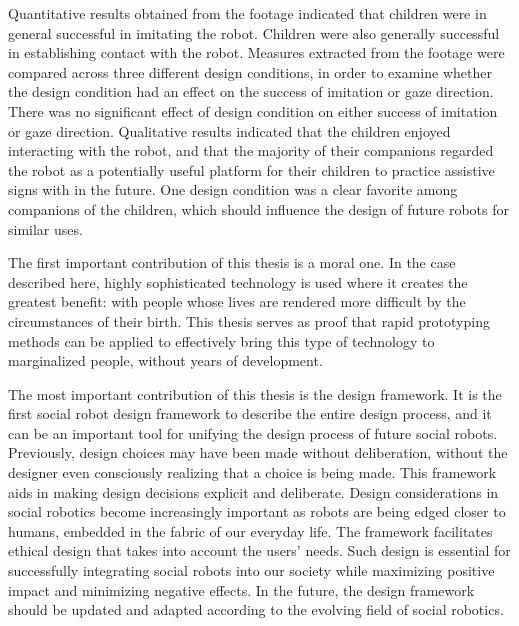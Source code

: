 Quantitative results obtained from the footage indicated that children were in general successful in imitating the robot. Children were also generally successful in establishing contact with the robot. Measures extracted from the footage were compared across three different design conditions, in order to examine whether the design condition had an effect on the success of imitation or gaze direction. There was no significant effect of design condition on either success of imitation or gaze direction. Qualitative results indicated that the children enjoyed interacting with the robot, and that the majority of their companions regarded the robot as a potentially useful platform for their children to practice assistive signs with in the future. One design condition was a clear favorite among companions of the children, which should influence the design of future robots for similar uses.

The first important contribution of this thesis is a moral one. In the case described here, highly sophisticated technology is used where it creates the greatest benefit: with people whose lives are rendered more difficult by the circumstances of their birth. This thesis serves as proof that rapid prototyping methods can be applied to effectively bring this type of technology to marginalized people, without years of development. 

The most important contribution of this thesis is the design framework. It is the first social robot design framework to describe the entire design process, and it can be an important tool for unifying the design process of future social robots. Previously, design choices may have been made without deliberation, without the designer even consciously realizing that a choice is being made. This framework aids in making design decisions explicit and deliberate. Design considerations in social robotics become increasingly important as robots are being edged closer to humans, embedded in the fabric of our everyday life. The framework facilitates ethical design that takes into account the users' needs. Such design is essential for successfully integrating social robots into our society while maximizing positive impact and minimizing negative effects. In the future, the design framework should be updated and adapted according to the evolving field of social robotics.





